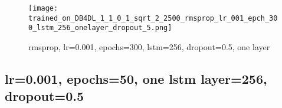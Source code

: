 \documentclass{article}
\begin{document}
\begin{figure}[H]
\centering
\texttt{[image: trained\_on\_DB4DL\_1\_1\_0\_1\_sqrt\_2\_2500\_rmsprop\_lr\_001\_epch\_300\_lstm\_256\_onelayer\_dropout\_5.png]}
\caption{rmsprop, lr=0.001, epochs=300, lstm=256, dropout=0.5, one layer}
\label{trained_on_DB4DL_1_1_0_1_sqrt_2_2500_rmsprop_lr_001_epch_300_lstm_256_onelayer_dropout_5}
\end{figure}

\bigskip
\subsection{lr=0.001, epochs=50, one lstm layer=256, dropout=0.5}
\end{document}
